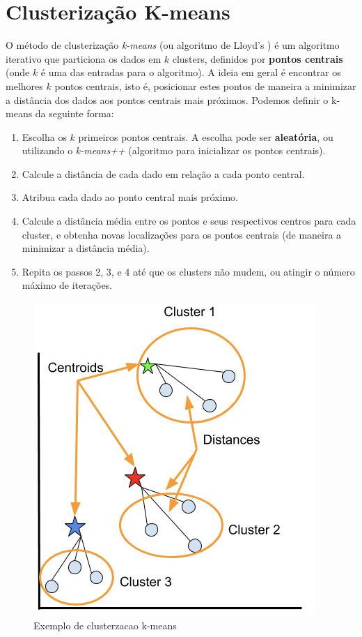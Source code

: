  \section{Clusterização K-means}
O método de clusterização \emph{k-means} (ou algoritmo de Lloyd's \cite{Lloyd}) é um algoritmo iterativo que particiona os dados em $k$ clusters, definidos por \textbf{pontos centrais} (onde $k$ é uma das entradas para o algoritmo).
A ideia em geral é encontrar os melhores $k$ pontos centrais, isto é, posicionar estes pontos de maneira a minimizar a distância dos dados aos pontos centrais mais próximos. 
Podemos definir o k-means da seguinte forma:
 \begin{enumerate}
 	\item Escolha os $k$ primeiros pontos centrais. A escolha pode ser \textbf{aleatória}, ou utilizando o \emph{k-means++} (algoritmo para inicializar os pontos centrais).
	\item Calcule a distância de cada dado em relação a cada ponto central.
	\item Atribua cada dado ao ponto central mais próximo.
	\item Calcule a distância média entre os pontos e seus respectivos centros para cada cluster, e obtenha novas localizações para os pontos centrais (de maneira a minimizar a distância média).
	\item Repita os passos 2, 3, e 4 até que os clusters não mudem, ou atingir o número máximo de iterações.
\end{enumerate}
 
 \begin{figure}[H]
   \centering
   \includegraphics[scale=0.40]{figs/kmeans.png}
    \caption{Exemplo de clusterzacao k-means}
    \label{fig:kmeans}
 \end{figure}
 
